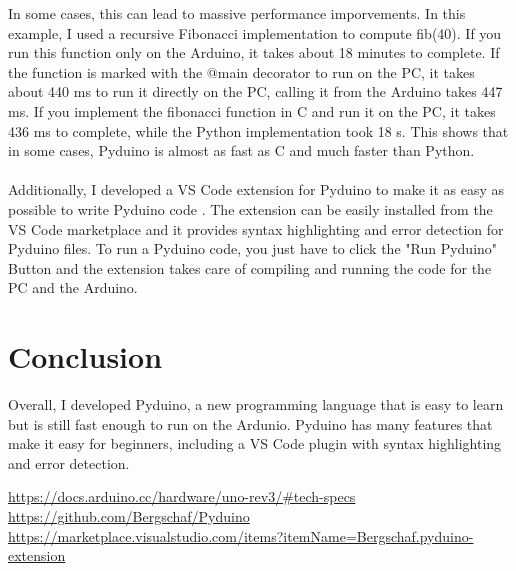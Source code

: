 \documentclass{article}
\begin{document}
\begin{multicols}{2}
In some cases, this can lead to massive performance imporvements. In this example, I used a recursive Fibonacci implementation to compute fib(40). If you run this function only on the Arduino, it takes about 18 minutes to complete. If the function is marked with the @main decorator to run on the PC, it takes about 440 ms to run it directly on the PC, calling it from the Arduino takes 447 ms. If you implement the fibonacci function in C and run it on the PC, it takes 436 ms to complete, while the Python implementation took 18 s. This shows that in some cases, Pyduino is almost as fast as C and much faster than Python. \\
\\
Additionally, I developed a VS Code extension for Pyduino to make it as easy as possible to write Pyduino code \cite{Q3}. The extension can be easily installed from the VS Code marketplace and it provides syntax highlighting and error detection for Pyduino files. To run a Pyduino code, you just have to click the "Run Pyduino" Button and the extension takes care of compiling and running the code for the PC and the Arduino.
\section{Conclusion}
\noindent Overall, I developed Pyduino, a new programming language that is easy to learn but is still fast enough to run on the Ardunio. Pyduino has many features that make it easy for beginners, including a VS Code plugin with syntax highlighting and error detection.


\begin{thebibliography}{99}
\url{https://docs.arduino.cc/hardware/uno-rev3/#tech-specs}
\url{https://github.com/Bergschaf/Pyduino}
\url{https://marketplace.visualstudio.com/items?itemName=Bergschaf.pyduino-extension}
\end{thebibliography}
\end{multicols}
\end{document}
